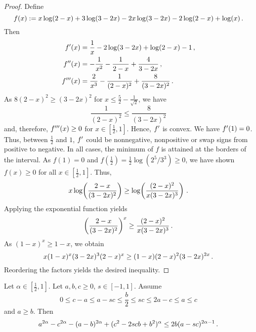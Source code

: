 \begin{proof}
	Define 
	\begin{equation*}
		f(x) := x \log(2-x) + 3 \log(3-2x) - 2x\log(3-2x) - 2\log(2-x) + \log(x)
		\, .
	\end{equation*}
	Then 
	\begin{align*}
		f^\prime(x) &= \frac1x - 2 \log(3 - 2 x) + \log(2 - x) - 1\, ,\\
		f^{\prime\prime}(x) &= -\frac1{x^2} - \frac1{2 - x} + \frac4{3 - 2 x}\, ,\\
		f^{\prime\prime\prime}(x) &= \frac2{x^3} - \frac1{(2 - x)^2} + \frac8{(3 - 2 x)^2}\, .
	\end{align*}
	As $8(2 - x)^2 \geq  (3 - 2 x)^2$ for $x \leq \frac52 - \frac1{\sqrt2}$, we have
	\begin{equation*}
		\frac1{(2 - x)^2} \leq \frac8{(3 - 2 x)^2}
	\end{equation*}
	and, therefore, $f^{\prime\prime\prime}(x) \geq 0$ for $x\in[\frac12,1]$. Hence, $f^\prime$ is convex. We have $f^\prime(1) = 0$. Thus, between $\frac12$ and $1$, $f^\prime$ could be nonnegative, nonpositive or swap signs from positive to negative. In all cases, the minimum of $f$ is attained at the borders of the interval. As $f(1) = 0$ and $f(\frac12) = \frac12\log(2^5/3^3) \geq 0$, we have shown $f(x) \geq 0$ for all $x\in [\frac12, 1]$. Thus,
	\begin{equation*}
		x \log\!\left( \frac{2-x}{(3-2x)^2} \right) \geq \log\!\left( \frac{(2-x)^2}{x(3-2x)^3} \right)
		\, .
	\end{equation*}
	Applying the exponential function yields
	\begin{equation*}
		\left( \frac{2-x}{(3-2x)^2} \right)^x \geq \frac{(2-x)^2}{x(3-2x)^3}
		\, .
	\end{equation*}
	As $(1-x)^x \geq 1-x$, we obtain
	\begin{equation*}
		x(1-x)^x(3-2x)^3(2-x)^x \geq (1-x)(2-x)^2(3-2x)^{2x}\, .
	\end{equation*}
	Reordering the factors yields the desired inequality.
\end{proof}
%
\begin{lemma}\label{lmm:bgeqascandageqb}
	Let $\alpha\in[\frac12,1]$.
	Let $a,b,c\geq0$, $s\in[-1,1]$.
	Assume 
	\begin{equation*}
		0 \leq c - a \leq a -sc \leq \frac b2 \leq sc \leq 2a-c \leq a \leq c
	\end{equation*}
	and
	$a \geq b$.
	Then
	\begin{equation*}
		a^{2\alpha}-c^{2\alpha}-(a-b)^{2\alpha}+(c^2 - 2 s c b + b^2)^\alpha 
		\leq 
		2 b (a-sc)^{2\alpha-1}
		\, .
	\end{equation*}
\end{lemma}
